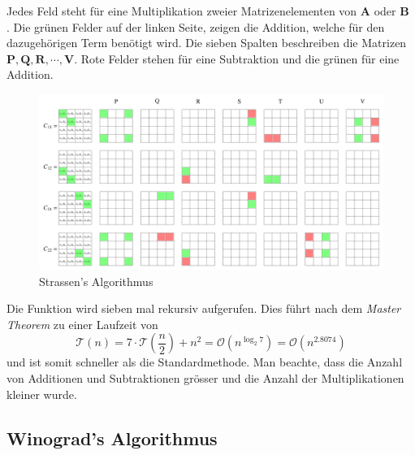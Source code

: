 Jedes Feld steht f\"ur eine Multiplikation zweier Matrizenelementen von $\mathbf{A}$ oder $\mathbf{B}$ .
Die gr\"unen Felder auf der linken Seite, zeigen die Addition, welche f\"ur den dazugeh\"origen Term ben\"otigt wird.
Die sieben Spalten beschreiben die Matrizen $\mathbf{P,Q,R, \dotsb, V}$.
Rote Felder stehen f\"ur eine Subtraktion und die gr\"unen f\"ur eine Addition.
\begin{figure}
	\center
	\includegraphics[width=\linewidth]{papers/multiplikation/images/strassen.pdf}
	\caption{Strassen's Algorithmus}
	\label{multiplikation:fig:strassen}
\end{figure}

Die Funktion wird sieben mal rekursiv aufgerufen.
Dies f\"uhrt nach dem \textit{Master Theorem} zu einer Laufzeit von
\begin{equation} \label{multiplikation:eq:laufzeitstrassen}
\mathcal{T}(n) =
7 \cdot \mathcal{T}(\frac{n}{2}) + n^2  = \mathcal{O}\left(n^{\log_2 7}\right ) = \mathcal{O}\left(n^{2.8074} \right )
\end{equation}
und ist somit schneller als die Standardmethode.
Man beachte, dass die Anzahl von Additionen und Subtraktionen gr\"osser und die Anzahl der Multiplikationen kleiner wurde.

\subsection{Winograd's Algorithmus}

